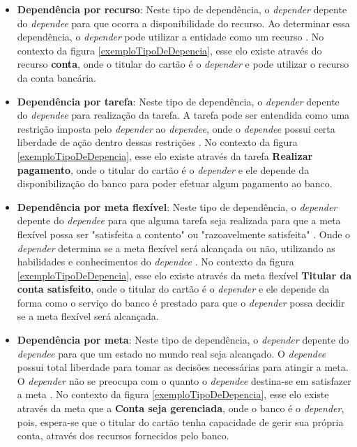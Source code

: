 \begin{itemize}
	\item \textbf{Dependência por recurso}: Neste tipo de dependência, o \textit{depender} depente do \textit{dependee} para que ocorra a disponibilidade do recurso. Ao determinar essa dependência, o \textit{depender} pode utilizar a entidade como um recurso \cite{istarwiki20}. No contexto da figura \ref{exemploTipoDeDepencia}, esse elo existe através do recurso \textbf{conta}, onde o titular do cartão é o \textit{depender} e pode utilizar o recurso da conta bancária.
	
	\item \textbf{Dependência por tarefa}: Neste tipo de dependência, o \textit{depender} depente do \textit{dependee} para realização da tarefa. A tarefa pode ser entendida como uma restrição imposta pelo \textit{depender} ao \textit{dependee}, onde o \textit{dependee} possui certa liberdade de ação dentro dessas restrições \cite{istarwiki20}. No contexto da figura \ref{exemploTipoDeDepencia}, esse elo existe através da tarefa \textbf{Realizar pagamento}, onde o titular do cartão é o \textit{depender} e ele depende da disponibilização do banco para poder efetuar algum pagamento ao banco. 
	
	\item \textbf{Dependência por meta flexível}: Neste tipo de dependência, o \textit{depender} depente do \textit{dependee} para que alguma tarefa seja realizada para que a meta flexível possa ser "satisfeita a contento" ou "razoavelmente satisfeita" \cite{istarwiki20}. Onde o \textit{depender} determina se a meta flexível será alcançada ou não, utilizando as habilidades e conhecimentos do \textit{dependee} \cite{napolitano2009estrategia}. No contexto da figura \ref{exemploTipoDeDepencia}, esse elo existe através da meta flexível \textbf{Titular da conta satisfeito}, onde o titular do cartão é o \textit{depender} e ele depende da forma como o serviço do banco é prestado para que o \textit{depender} possa decidir se a meta flexível será alcançada.
	
	\item \textbf{Dependência por meta}: Neste tipo de dependência, o \textit{depender} depente do \textit{dependee} para que um estado no mundo real seja alcançado. O \textit{dependee} possui total liberdade para tomar as decisões necessárias para atingir a meta. O \textit{depender} não se preocupa com o quanto o \textit{dependee} destina-se em satisfazer a meta \cite{istarwiki20}. No contexto da figura \ref{exemploTipoDeDepencia}, esse elo existe através da meta que a \textbf{Conta seja gerenciada}, onde o banco é o \textit{depender}, pois, espera-se que o titular do cartão tenha capacidade de gerir sua própria conta, através dos recursos fornecidos pelo banco. 
\end{itemize}

